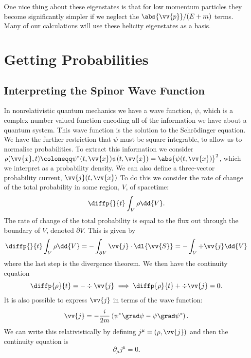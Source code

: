 \documentclass[fleqn]{NotesClass}
\begin{document}
    One nice thing about these eigenstates is that for low momentum particles they become significantly simpler if we neglect the \(\abs{\vv{p}}/(E + m)\) terms.
    Many of our calculations will use these helicity eigenstates as a basis.
    
    \chapter{Getting Probabilities}
    \section{Interpreting the Spinor Wave Function}
    In nonrelativistic quantum mechanics we have a wave function, \(\psi\), which is a complex number valued function encoding all of the information we have about a quantum system.
    This wave function is the solution to the Schrödinger equation.
    We have the further restriction that \(\psi\) must be square integrable, to allow us to normalise probabilities.
    To extract this information we consider \(\rho(\vv{x}, t) \coloneqq \psi^*(t, \vv{x}) \psi(t, \vv{x}) = \abs{\psi(t, \vv{x})}^2\), which we interpret as a probability density.
    We can also define a three-vector probability current, \(\vv{j}(t, \vv{x})\)
    To do this we consider the rate of change of the total probability in some region, \(V\), of spacetime:
    \begin{equation}
        \diffp{}{t}\int_V \rho \dd{V}.
    \end{equation}
    The rate of change of the total probability is equal to the flux out through the boundary of \(V\), denoted \(\partial V\).
    This is given by 
    \begin{equation}
        \diffp{}{t} \int_V \rho \dd{V} = -\int_{\partial V} \vv{j} \cdot \dl{\vv{S}} = -\int_V \div\vv{j} \dd{V}
    \end{equation}
    where the last step is the divergence theorem.
    We then have the continuity equation
    \begin{equation}
        \diffp{\rho}{t} = -\div\vv{j} \implies \diffp{\rho}{t} + \div\vv{j} = 0.
    \end{equation}
    It is also possible to express \(\vv{j}\) in terms of the wave function:
    \begin{equation}
        \vv{j} = -\frac{i}{2m} \left( \psi^* \grad \psi - \psi \grad \psi^* \right).
    \end{equation}
    We can write this relativistically by defining \(j^\mu = (\rho, \vv{j})\) and then the continuity equation is
    \begin{equation}
        \partial_\mu j^\mu = 0.
    \end{equation}
    
\end{document}

